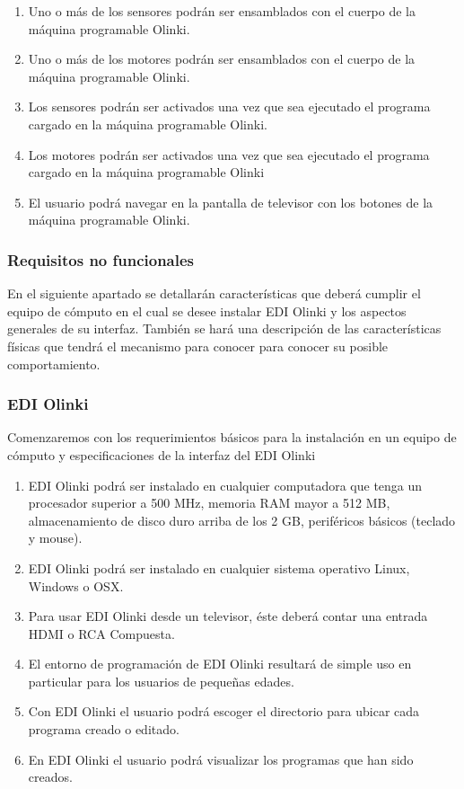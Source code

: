 \documentclass[letterpaper,10pt]{article}
\begin{document}
\begin{enumerate}
	\item Uno o más de los sensores podrán ser ensamblados con el cuerpo de la máquina programable Olinki.
	\item Uno o más de los motores podrán ser ensamblados con el cuerpo de la máquina programable Olinki.
	\item Los sensores podrán ser activados una vez que sea ejecutado el programa cargado en la máquina programable Olinki.
	\item Los motores podrán ser activados una vez que sea ejecutado el programa cargado en la máquina programable Olinki
	\item El usuario podrá navegar en la pantalla de televisor con los botones de la máquina programable Olinki.
\end{enumerate}

\subsubsection{Requisitos no funcionales}

En el siguiente apartado se detallarán características que deberá cumplir el equipo de cómputo en el cual se desee instalar EDI Olinki y los aspectos generales de su interfaz. 
También se hará una descripción de las características físicas que tendrá el mecanismo para conocer para conocer su posible comportamiento.

\subsubsection{EDI Olinki}


Comenzaremos con los requerimientos básicos para la instalación en un equipo de cómputo y especificaciones de la interfaz  del EDI Olinki
\begin{enumerate}
	\item EDI Olinki podrá ser instalado en cualquier computadora que tenga un procesador superior a 500 MHz, memoria RAM mayor a 512 MB, 
	almacenamiento de disco duro arriba de los 2 GB, periféricos básicos (teclado y mouse).
	\item EDI Olinki podrá ser instalado en cualquier sistema operativo Linux, Windows o OSX.
	\item Para usar EDI Olinki desde un televisor, éste deberá contar una entrada HDMI o RCA Compuesta.
	\item El entorno de programación de EDI Olinki resultará de simple uso en particular para los usuarios de pequeñas edades.
	\item Con EDI Olinki el usuario podrá escoger el directorio para ubicar cada programa creado o editado.
	\item En EDI Olinki el usuario podrá visualizar los programas que han sido creados.

\end{enumerate}
\end{document}
